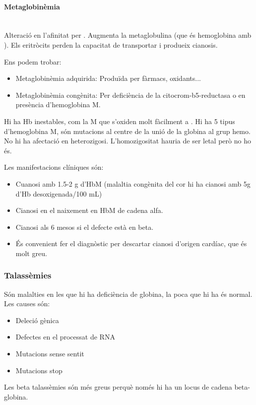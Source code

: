 \begin{itemize}
\paragraph{Metaglobinèmia} \hfill \\
Alteració en l'afinitat per . Augmenta la metaglobulina (que és
hemoglobina amb ). Els eritròcits perden la capacitat de
transportar  i produeix cianosis.

Ens podem trobar:
\begin{itemize}
\item Metaglobinèmia adquirida: Produïda per fàrmacs, oxidants...

\item Metaglobinèmia congènita: Per deficiència de la
  citocrom-b5-reductasa o en presència d'hemoglobina M.
\end{itemize}

Hi ha Hb inestables, com la M que s'oxiden molt fàcilment a
. Hi ha 5 tipus d'hemoglobina M, són mutacions al centre de
la unió de la globina al grup hemo. No hi ha afectació en
heterozigosi. L'homozigositat hauria de ser letal però no ho és.

Les manifestacions clíniques són:
\begin{itemize}
\item Cuanosi amb 1.5-2 g d'HbM (malaltia congènita del cor hi ha
  cianosi amb 5g d'Hb desoxigenada/100 mL)
\item Cianosi en el naixement en HbM de cadena alfa.
\item Cianosi als 6 mesos si el defecte està en beta.
\item És convenient fer el diagnòstic per descartar cianosi d'origen
  cardíac, que és molt greu.
\end{itemize}

\subsubsection{Talassèmies}
Són malalties en les que hi ha deficiència de globina, la poca que hi
ha és normal. Les causes són:
\begin{itemize}
\item Deleció gènica
\item Defectes en el processat de RNA
\item Mutacions sense sentit
\item Mutacions stop
\end{itemize}

Les beta talassèmies són més greus perquè només hi ha un locus de
cadena beta-globina.


\end{itemize}
